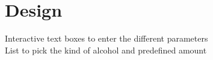 \section{Design}
\label{sec:design}

Interactive text boxes to enter the different parameters\\
List to pick the kind of alcohol and predefined amount\\
